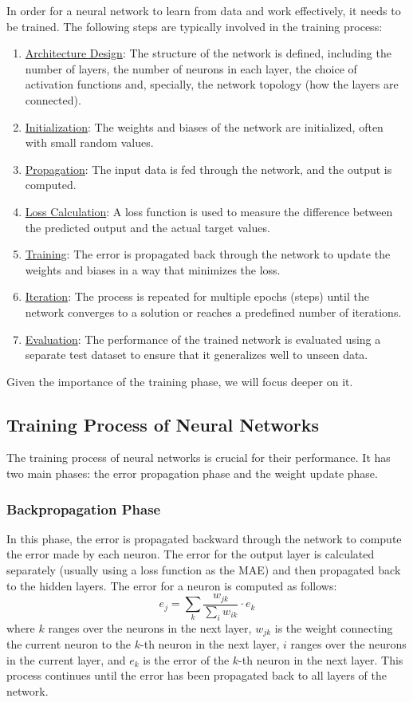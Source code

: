In order for a neural network to learn from data and work effectively, it needs to be trained. The following steps are typically involved in the training process:
\begin{enumerate}
    \item \ul{Architecture Design}: The structure of the network is defined, including the number of layers, the number of neurons in each layer, the choice of activation functions and, specially, the network topology (how the layers are connected).
    \item \ul{Initialization}: The weights and biases of the network are initialized, often with small random values.
    \item \ul{Propagation}: The input data is fed through the network, and the output is computed.
    \item \ul{Loss Calculation}: A loss function is used to measure the difference between the predicted output and the actual target values.
    \item \ul{Training}: The error is propagated back through the network to update the weights and biases in a way that minimizes the loss.
    \item \ul{Iteration}: The process is repeated for multiple epochs (steps) until the network converges to a solution or reaches a predefined number of iterations.
    \item \ul{Evaluation}: The performance of the trained network is evaluated using a separate test dataset to ensure that it generalizes well to unseen data.
\end{enumerate}

Given the importance of the training phase, we will focus deeper on it.
\subsection{Training Process of Neural Networks}

The training process of neural networks is crucial for their performance. It has two main phases: the error propagation phase and the weight update phase.
\subsubsection{Backpropagation Phase}
In this phase, the error is propagated backward through the network to compute the error made by each neuron. The error for the output layer is calculated separately (usually using a loss function as the MAE) and then propagated back to the hidden layers. The error for a neuron is computed as follows:
\begin{equation*}
    e_j = \sum_{k} \dfrac{w_{jk}}{\sum\limits_{i} w_{ik}} \cdot e_k
\end{equation*}
where $k$ ranges over the neurons in the next layer, $w_{jk}$ is the weight connecting the current neuron to the $k$-th neuron in the next layer, $i$ ranges over the neurons in the current layer, and $e_k$ is the error of the $k$-th neuron in the next layer. This process continues until the error has been propagated back to all layers of the network.


